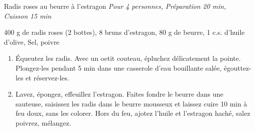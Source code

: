 \begin{recette}{Radis roses au beurre à l’estragon}
  \emph{Pour 4 personnes, Préparation 20 min, Cuisson 15 min}
  \begin{ingredients}
    400 g de radis roses (2 bottes)\sep
    8 bruns d’estragon\sep
    80 g de beurre\sep
    1 c.s. d’huile d’olive\sep
    Sel, poivre
  \end{ingredients} 
	\begin{enumerate}
	\item Équeutez les radis. Avec un oetit couteau, épluchez délicatement la pointe. Plongez-les pendant 5 min dans une casserole d’eau bouillante salée, égouttez-les et réservez-les.
  \item Lavez, épongez, effeuillez l’estragon. Faites fondre le beurre dans une sauteuse, saisissez les radis dans le beurre mousseux et laissez cuire 10 min à feu doux, sans les colorer. Hors du feu, ajotez l’huile et l’estragon haché, salez poivrez, mélangez.
  \end{enumerate}
\end{recette}
